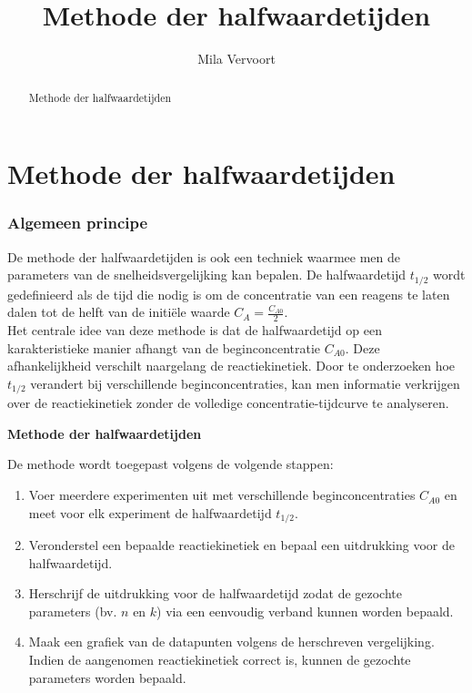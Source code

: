 \documentclass{ximera}
\title{Methode der halfwaardetijden}
\author{Mila Vervoort}
\begin{document}
\begin{abstract}
    Methode der halfwaardetijden
\end{abstract}
\maketitle
\label{xim:Methode der halfwaardetijden}

\section*{Methode der halfwaardetijden}
\label{Methode der halfwaardetijden}
\subsubsection*{Algemeen principe}
De methode der halfwaardetijden is ook een techniek waarmee men de parameters van de snelheidsvergelijking kan bepalen. De halfwaardetijd $t_{1/2}$ wordt gedefinieerd als de tijd die nodig is om de concentratie van een reagens te laten dalen tot de helft van de initiële waarde $C_A = \frac{C_{A0}}{2}$.\\
Het centrale idee van deze methode is dat de halfwaardetijd op een karakteristieke manier afhangt van de beginconcentratie $C_{A0}$. Deze afhankelijkheid verschilt naargelang de reactiekinetiek.
Door te onderzoeken hoe $t_{1/2}$ verandert bij verschillende beginconcentraties, kan men informatie verkrijgen over de reactiekinetiek zonder de volledige concentratie-tijdcurve te analyseren.

\begin{procedure} \textbf{Methode der halfwaardetijden}

De methode wordt toegepast volgens de volgende stappen:

\begin{enumerate}
    \item Voer meerdere experimenten uit met verschillende beginconcentraties $C_{A0}$ en meet voor elk experiment de halfwaardetijd $t_{1/2}$.

    \item Veronderstel een bepaalde reactiekinetiek en bepaal een uitdrukking voor de halfwaardetijd.

    \item Herschrijf de uitdrukking voor de halfwaardetijd zodat de gezochte parameters (bv. $n$ en $k$) via een eenvoudig verband kunnen worden bepaald.
    
    \item Maak een grafiek van de datapunten volgens de herschreven vergelijking. Indien de aangenomen reactiekinetiek correct is, kunnen de gezochte parameters worden bepaald.
\end{enumerate}

\end{procedure}
\text{ }  \\
\end{document}
